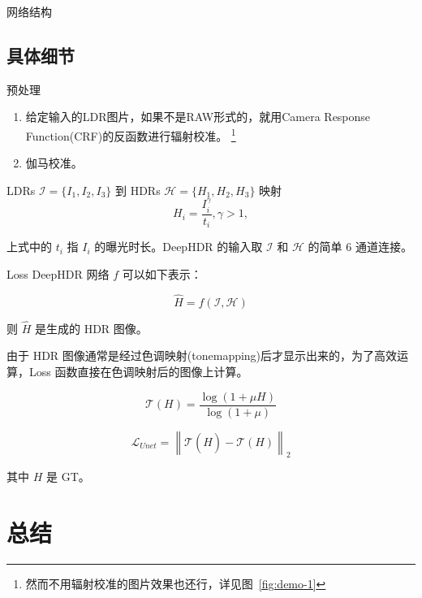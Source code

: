 \documentclass{beamer}
\newcommand{\norm}[1]{\left\lVert#1\right\rVert}
\begin{document}
    \begin{frame}{网络结构}
    \end{frame}

    \subsection{具体细节}

    \begin{frame}{预处理}
        \begin{enumerate}
            \item 给定输入的LDR图片，如果不是RAW形式的，就用Camera Response Function(CRF)的反函数进行辐射校准。
            \footnote{然而不用辐射校准的图片效果也还行，详见图~\ref{fig:demo-1}}
            \item 伽马校准。
        \end{enumerate}

        \pause
        \begin{block}{LDRs $\mathcal{I}=\{I_1,I_2,I_3\}$ 到 HDRs $\mathcal{H}=\{H_1,H_2,H_3\}$ 映射}
            $$H_i=\frac{I_i^\gamma}{t_i}, \gamma > 1, $$
        \end{block}

        \pause
        上式中的 $t_i$ 指 $I_i$ 的曝光时长。DeepHDR 的输入取 $\mathcal{I}$ 和 $\mathcal{H}$ 的简单 6 通道连接。
    \end{frame}

    \begin{frame}{Loss}
        DeepHDR 网络 $f$ 可以如下表示：

        $$\hat{H} = f(\mathcal{I}, \mathcal{H})$$

        则 $\hat{H}$ 是生成的 HDR 图像。

        由于 HDR 图像通常是经过色调映射(tonemapping)后才显示出来的，为了高效运算，Loss 函数直接在色调映射后的图像上计算。

        $$\mathcal{T}(H) = \frac{\log(1+\mu H)}{\log(1+\mu)}$$

        $$\mathcal{L}_{Unet} = \norm{\mathcal{T}(\hat{H}) - \mathcal{T}(H)}_2$$

        其中 $H$ 是 GT。

    \end{frame}

    \section{总结}

    
\end{document}
